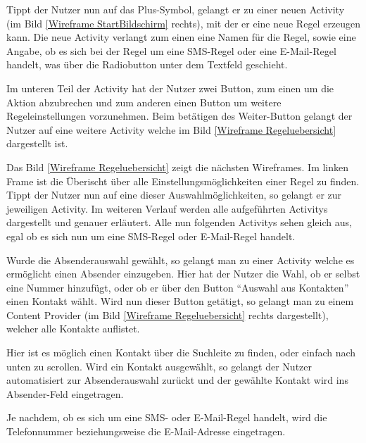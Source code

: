 Tippt der Nutzer nun auf das Plus-Symbol, gelangt er zu einer neuen Activity (im Bild \ref{Wireframe StartBildschirm} rechts), mit der er eine neue Regel erzeugen kann.
Die neue Activity verlangt zum einen eine Namen f\"ur die Regel, sowie eine Angabe, ob es sich bei der Regel um eine SMS-Regel oder eine E-Mail-Regel handelt, was \"uber die Radiobutton unter dem Textfeld geschieht.

Im unteren Teil der Activity hat der Nutzer zwei Button, zum einen um die Aktion abzubrechen und zum anderen einen Button um weitere Regeleinstellungen vorzunehmen.
Beim bet\"atigen des Weiter-Button gelangt der Nutzer auf eine weitere Activity welche im Bild \ref{Wireframe Regeluebersicht} dargestellt ist.

Das Bild \ref{Wireframe Regeluebersicht} zeigt die n\"achsten Wireframes. Im linken Frame ist die \"Uberischt \"uber alle Einstellungsm\"oglichkeiten einer Regel zu finden. Tippt der Nutzer nun auf eine dieser Auswahlm\"oglichkeiten, so gelangt er zur jeweiligen Activity. Im weiteren Verlauf werden alle aufgef\"uhrten Activitys dargestellt und genauer erl\"autert.
Alle nun folgenden Activitys sehen gleich aus, egal ob es sich nun um eine SMS-Regel oder E-Mail-Regel handelt.

Wurde die Absenderauswahl gew\"ahlt, so gelangt man zu einer Activity welche es erm\"oglicht einen Absender einzugeben. Hier hat der Nutzer die Wahl, ob er selbst eine Nummer hinzuf\"ugt, oder ob er \"uber den Button "`Auswahl aus Kontakten"' einen Kontakt w\"ahlt. Wird nun dieser Button get\"atigt, so gelangt man zu einem Content Provider (im Bild \ref{Wireframe Regeluebersicht} rechts dargestellt), welcher alle Kontakte auflistet. 

Hier ist es m\"oglich einen Kontakt \"uber die Suchleite zu finden, oder einfach nach unten zu scrollen. Wird ein Kontakt ausgew\"ahlt, so gelangt der Nutzer automatisiert zur Absenderauswahl zur\"uckt und der gew\"ahlte Kontakt wird ins Absender-Feld eingetragen.

Je nachdem, ob es sich um eine SMS- oder E-Mail-Regel handelt, wird die Telefonnummer beziehungsweise die E-Mail-Adresse eingetragen.

